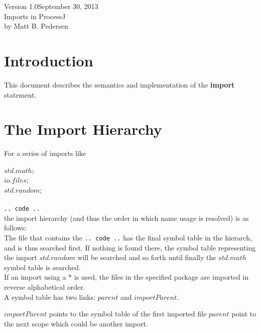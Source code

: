 \documentclass[pdflatex,11pt,letter]{article}
\begin{document}
\begin{center}
Version 1.0\hfill{}September 30, 2013\\[0.5cm]
{\Huge Imports in ProcessJ}\\[0.5cm]
by Matt B. Pedersen
\end{center}

\section{Introduction}

This document describes the semantics and implementation of the 
{\bf import} statement.

\section{The Import Hierarchy}


For a series of imports like

\noindent
\hspace*{1cm}{\bf import} $std.math$;\\
\hspace*{1cm}{\bf import} $io.files$;\\
\hspace*{1cm}{\bf import} $std.random$;\\
\\
{\tt .. code .. }\\

\noindent
the import hierarchy (and thus the order in which name usage is resolved)
is as follows:\\

\noindent
The file that contains the {\tt .. code ..} has the final symbol table in the 
hierarch, and is thus searched first. If nothing is found there, the 
symbol table representing the import $std.random$ will be searched 
and so forth until finally the $std.math$ symbol table is searched.\\

\noindent
If an import using a * is used, the files in the specified package 
are imported in reverse alphabetical order.\\

\noindent
A symbol table has two links: $parent$ and $importParent$.

\noindent
$importParent$ points to the symbol table of the first imported file
$parent$ point to the next scope which could be another import.\\
\end{document}
